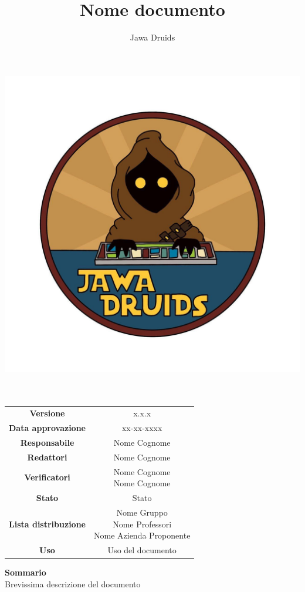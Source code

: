 \documentclass[a4paper,12pt]{report}
\begin{document}
\makeatletter
\begin{titlepage}
	\begin{center}
		\vspace*{-4,0cm}
		\author{Jawa Druids} 
		\title{Nome documento}
		\date{} %
		\includegraphics[width=0.7\linewidth]{../immagini/DRUIDSLOGO.jpg}\\[4ex]
		{\huge \bfseries  \@title }\\[2ex] 
		{\LARGE  \@author}\\[50ex]
		\vspace*{-8,0cm}
		\begin{table}[H]
			\centering
			\begin{tabular}{c|c}
				\textbf{Versione} & x.x.x \\ %
				\textbf{Data approvazione} & xx-xx-xxxx\\
				\textbf{Responsabile} & Nome Cognome\\ 
				\textbf{Redattori} & Nome Cognome \\
				\textbf{Verificatori} & \makecell{Nome Cognome \\ Nome Cognome} \\
				\textbf{Stato} & Stato\\
				\textbf{Lista distribuzione} & \makecell{Nome Gruppo \\ Nome Professori \\ Nome Azienda Proponente}\\
				\textbf{Uso} & Uso del documento            
			\end{tabular}
		\end{table}
		\vspace{0.6cm}
		\hfill \break
		\fontsize{17}{10}\textbf{Sommario} \\
		\vspace{0.1cm}
		Brevissima descrizione del documento 
	\end{center}
\end{titlepage}
\makeatother




\tableofcontents{}


\end{document}
